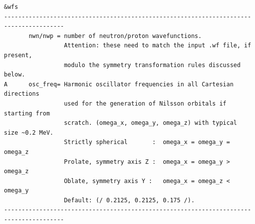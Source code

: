 \documentclass[print,amsmath,amssymb,aps,prc,nofootinbib,notitlepage]{revtex4-1}
\begin{document}
\begin{Verbatim}
&wfs
---------------------------------------------------------------------------------------
       nwn/nwp = number of neutron/proton wavefunctions. 
                 Attention: these need to match the input .wf file, if present,
                 modulo the symmetry transformation rules discussed below.
A      osc_freq= Harmonic oscillator frequencies in all Cartesian directions
                 used for the generation of Nilsson orbitals if starting from
                 scratch. (omega_x, omega_y, omega_z) with typical size ~0.2 MeV.
                 Strictly spherical       :  omega_x = omega_y = omega_z
                 Prolate, symmetry axis Z :  omega_x = omega_y > omega_z                                  
                 Oblate, symmetry axis Y :   omega_x = omega_z < omega_y                                  
                 Default: (/ 0.2125, 0.2125, 0.175 /).
---------------------------------------------------------------------------------------
\end{Verbatim}
\clearpage
\end{document}
